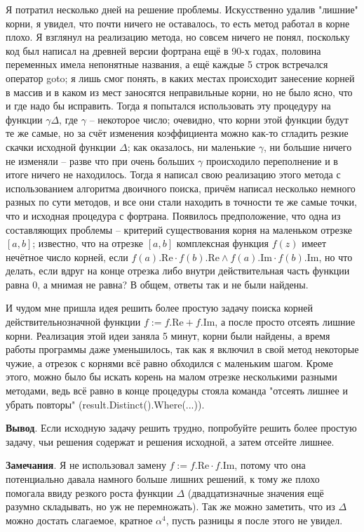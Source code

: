 \documentclass[a4paper, 12pt]{article}
\begin{document}
    Я потратил несколько дней на решение проблемы. Искусственно удалив "лишние" корни, я увидел, что почти ничего не оставалось, то есть метод работал в корне плохо.
    Я взглянул на реализацию метода, но совсем ничего не понял, поскольку код был написал на древней версии фортрана ещё в 90-х годах, половина переменных имела непонятные названия, а ещё каждые 5 строк встречался оператор goto; я лишь смог понять, в каких местах происходит занесение корней в массив и в каком из мест заносятся неправильные корни, но не было ясно, что и где надо бы исправить.
    Тогда я попытался использовать эту процедуру на функции $\gamma \Delta$, где $\gamma$ -- некоторое число; очевидно, что корни этой функции будут те же самые, но за счёт изменения коэффициента можно как-то сгладить резкие скачки исходной функции $\Delta$; как оказалось, ни маленькие $\gamma$, ни большие ничего не изменяли -- разве что при очень больших $\gamma$ происходило переполнение и в итоге ничего не находилось.
Тогда я написал свою реализацию этого метода с использованием алгоритма двоичного поиска, причём написал несколько немного разных по сути методов, и все они стали находить в точности те же самые точки, что и исходная процедура с фортрана. Появилось предположение, что одна из составляющих проблемы -- критерий существования корня на маленьком отрезке $[a,b]$; известно, что на отрезке $[a,b]$ комплексная функция $f(z)$ имеет нечётное число корней, если $f(a).\text{Re}\cdot f(b).\text{Re} \land f(a).\text{Im}\cdot f(b).\text{Im}$, но что делать, если вдруг на конце отрезка либо внутри действительная часть функции равна 0, а мнимая не равна? В общем, ответы так и не были найдены.

И чудом мне пришла идея решить более простую задачу поиска корней действительнозначной функции $f:=f.\text{Re}+f.\text{Im}$, а после просто отсеять лишние корни. Реализация этой идеи заняла 5 минут, корни были найдены, а время работы программы даже уменьшилось, так как я включил в свой метод некоторые чужие, а отрезок с корнями всё равно обходился с маленьким шагом. Кроме этого, можно было бы искать корень на малом отрезке несколькими разными методами, ведь всё равно в конце процедуры стояла команда "отсеять лишнее и убрать повторы" (result.Distinct().Where(...)).

{\bf Вывод}. Если исходную задачу решить трудно, попробуйте решить более простую задачу, чьи решения содержат и решения исходной, а затем отсейте лишнее. 

{\bf Замечания}. Я не использовал замену $f:=f.\text{Re} \cdot f.\text{Im}$, потому что она потенциально давала намного больше лишних решений, к тому же плохо помогала ввиду резкого роста функции $\Delta$ (двадцатизначные значения ещё разумно складывать, но уж не перемножать). Так же можно заметить, что из $\Delta$ можно достать слагаемое, кратное $\alpha^4$, пусть разницы я после этого не увидел.
\end{document}
